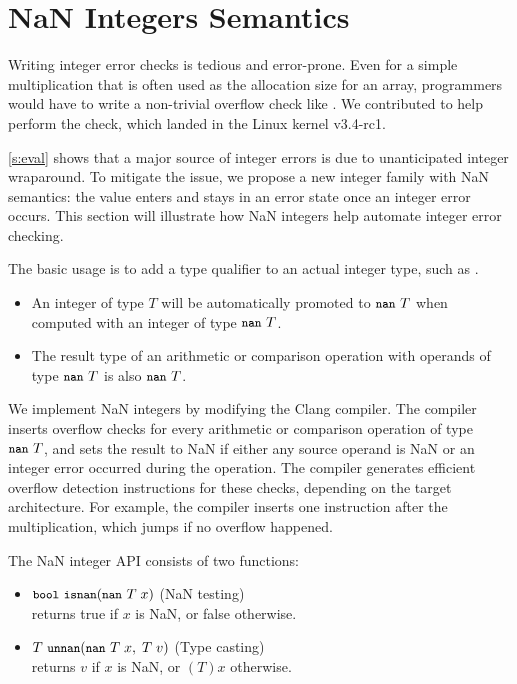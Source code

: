 \section{NaN Integers Semantics}
\label{s:miti}

Writing integer error checks is tedious and error-prone.
Even for a simple multiplication  that is often used
as the allocation size for an array, programmers would
have to write a non-trivial overflow check like .  We contributed 
to help perform the check, which landed in the Linux kernel v3.4-rc1.
\fi

\autoref{s:eval} shows that a major source of integer errors is due
to unanticipated integer wraparound.  To mitigate the issue, we
propose a new integer family with NaN semantics: the value enters
and stays in an error state once an integer error occurs.
%
This section will illustrate how NaN integers help automate integer
error checking.

The basic usage is to add a type qualifier 
to an actual integer type, such as .
\begin{itemize}
\item
An integer of type $T$ will be automatically promoted to $\cc{nan}\ T$
when computed with an integer of type $\cc{nan}\ T$.
\item
The result type of an arithmetic or comparison operation with
operands of type $\cc{nan}\ T$ is also $\cc{nan}\ T$.
\end{itemize}

We implement NaN integers by modifying the Clang compiler.
The compiler inserts overflow checks for every arithmetic or
comparison operation of type $\cc{nan}\ T$, and sets the result to
NaN if either any source operand is NaN or an integer error occurred
during the operation.
%
The compiler generates efficient overflow detection instructions
for these checks, depending on the target architecture.  For example,
the compiler inserts one  instruction after the multiplication,
which jumps if no overflow happened.

The NaN integer API consists of two functions:
\begin{itemize}
\item
$\cc{bool}\ \cc{isnan}(\cc{nan}\ T\; x)$ \hfill (NaN testing) \\
returns true if $x$ is NaN, or false otherwise.
\item
$T\ \cc{unnan}(\cc{nan}\ T\; x,\; T\; v)$ \hfill (Type casting) \\
returns $v$ if $x$ is NaN, or $(T)x$ otherwise.
\end{itemize}

